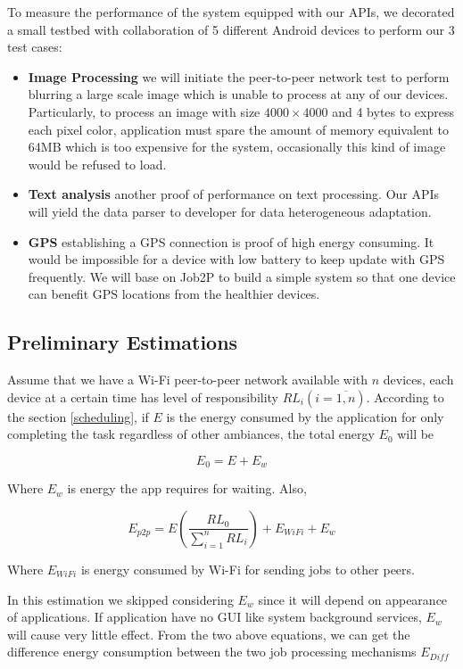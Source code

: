 \documentclass[conference]{IEEEtran}
\begin{document}
To measure the performance of the system equipped with our APIs, we decorated a small testbed with collaboration of 5 different Android devices to perform our 3 test cases:
\begin{itemize}
	\item \textbf{Image Processing} we will initiate the peer-to-peer network test to perform blurring a large scale image which is unable to process at any of our devices. Particularly, to process an image with size $4000 \times 4000$ and 4 bytes to express each pixel color, application must spare the amount of memory equivalent to 64MB which is too expensive for the system, occasionally this kind of image would be refused to load. 
	\item \textbf{Text analysis} another proof of performance on text processing. Our APIs will yield the data parser to developer for data heterogeneous adaptation.
	\item \textbf{GPS} establishing a GPS connection is proof of high energy consuming. It would be impossible for a device with low battery to keep update with GPS frequently. We will base on Job2P to build a simple system so that one device can benefit GPS locations from the healthier devices.
\end{itemize}

\subsection{Preliminary Estimations}
Assume that we have a Wi-Fi peer-to-peer network available with $n$ devices, each device at a certain time has level of responsibility $RL_{i} (i = \overline{1,n})$. According to the section \ref{scheduling}, if $E$ is the energy consumed by the application for only completing the task regardless of other ambiances, the total energy $E_{0}$ will be

$$E_{0} = E + E_{w}$$

Where $E_{w}$ is energy the app requires for waiting. Also, 

$$E_{p2p} = E(\frac{RL_{0}}{\sum_{i = 1}^{n}{RL_{i}}}) + E_{WiFi} + E_{w}$$ 

Where $E_{WiFi}$ is energy consumed by Wi-Fi for sending jobs to other peers.

In this estimation we skipped considering $E_{w}$ since it will depend on appearance of applications. If application have no GUI like system background services, $E_{w}$ will cause very little effect. From the two above equations, we can get the difference energy consumption between the two job processing mechanisms $E_{Diff}$ 
\end{document}
